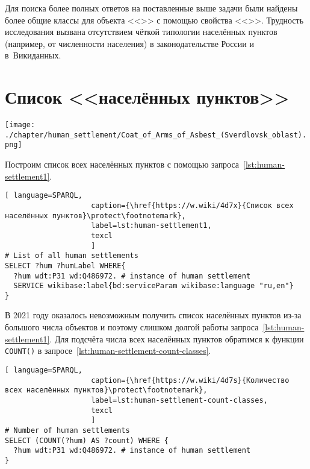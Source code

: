 Для поиска более полных ответов на поставленные выше задачи  
были найдены более общие классы для объекта <<>> 
с помощью свойства <<>>. 
Трудность исследования вызвана отсутствием чёткой типологии населённых пунктов 
(например, от численности населения) в законодательстве России и в~Викиданных.



\section{Список <<населённых пунктов>>}
\begin{marginfigure}[0.0cm]
{\texttt{[image: ./chapter/human\_settlement/Coat\_of\_Arms\_of\_Asbest\_(Sverdlovsk\_oblast).png]}}
  \caption[Герб второго неизвестного населённого пункта.]{Это герб населённого пункта России или другой страны?\newline%
См. ответ~\protect\ref{answer:flag_human_settlements} на с.~\protect\pageref{answer:flag_human_settlements}.}
  \label{fig:flag_question_human_settlements2}%
\end{marginfigure}

Построим список всех населённых пунктов с помощью запроса~\ref{lst:human-settlement1}.

\begin{lstlisting}[ language=SPARQL, 
                    caption={\href{https://w.wiki/4d7x}{Список всех населённых пунктов}\protect\footnotemark},
                    label=lst:human-settlement1,
                    texcl 
                    ]
# List of all human settlements
SELECT ?hum ?humLabel WHERE{
  ?hum wdt:P31 wd:Q486972. # instance of human settlement
  SERVICE wikibase:label{bd:serviceParam wikibase:language "ru,en"}
}
\end{lstlisting}%

В 2021 году оказалось невозможным получить список населённых пунктов 
из-за большого числа объектов и поэтому слишком долгой работы запроса~\ref{lst:human-settlement1}. 
Для подсчёта числа всех населённых пунктов обратимся к функции \lstinline|COUNT()| 
в запросе~\ref{lst:human-settlement-count-classes}.

\begin{lstlisting}[ language=SPARQL, 
                    caption={\href{https://w.wiki/4d7s}{Количество всех населённых пунктов}\protect\footnotemark},
                    label=lst:human-settlement-count-classes,
                    texcl 
                    ]
# Number of human settlements
SELECT (COUNT(?hum) AS ?count) WHERE {
  ?hum wdt:P31 wd:Q486972. # instance of human settlement  
}
\end{lstlisting}%

